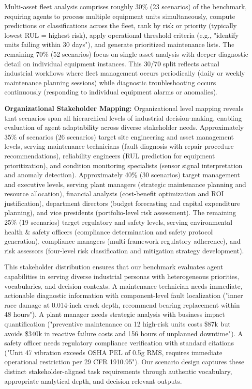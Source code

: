 \documentclass[sigconf]{acmart}
\begin{document}
Multi-asset fleet analysis comprises roughly 30\% (23 scenarios) of the benchmark, requiring agents to process multiple equipment units simultaneously, compute predictions or classifications across the fleet, rank by risk or priority (typically lowest RUL = highest risk), apply operational threshold criteria (e.g., "identify units failing within 30 days"), and generate prioritized maintenance lists. The remaining 70\% (52 scenarios) focus on single-asset analysis with deeper diagnostic detail on individual equipment instances. This 30/70 split reflects actual industrial workflows where fleet management occurs periodically (daily or weekly maintenance planning sessions) while diagnostic troubleshooting occurs continuously (responding to individual equipment alarms or anomalies).

\textbf{Organizational Stakeholder Mapping:} Organizational level mapping reveals that scenarios span all hierarchical levels of industrial decision-making, enabling evaluation of agent adaptability across diverse stakeholder needs. Approximately 35\% of scenarios (26 scenarios) target site engineering and asset management levels, serving maintenance technicians (fault diagnosis with repair procedure recommendations), reliability engineers (RUL prediction for equipment prioritization), and condition monitoring specialists (sensor signal interpretation and anomaly detection). Approximately 40\% (30 scenarios) target management and executive levels, serving plant managers (strategic maintenance planning and resource allocation), financial analysts (cost-benefit optimization and ROI justification), department directors (budget forecasting and capital expenditure planning), and vice presidents (portfolio-level risk assessment). The remaining 25\% (19 scenarios) target regulatory and safety levels, serving environmental health \& safety officers (compliance determination and safety protocol generation), compliance managers (multi-framework regulatory adherence), and risk assessors (four-level risk classification and mitigation strategy development).

This stakeholder distribution ensures that our benchmark evaluates agent capabilities in serving diverse industrial personas with heterogeneous priorities, vocabularies, and decision contexts. A maintenance technician needs immediate, actionable diagnostic information with component-level fault localization ("inner race damage at 0.014-inch crack depth, recommend bearing replacement within 48 hours"). A plant manager needs strategic analysis with business impact quantification ("preventive maintenance on 12 high-risk units costs \$87k but avoids \$340k in reactive failure costs and 156 hours of unplanned downtime"). A safety officer needs regulatory compliance verification with standard citations ("Unit 47 vibration exceeds OSHA PEL of 0.5g RMS, requires immediate operational restriction per 29 CFR 1910.95"). Our scenario design captures these distinct stakeholder-aligned task requirements through authentic vocabulary, appropriate analytical depth, and decision-relevant outputs.
\end{document}
